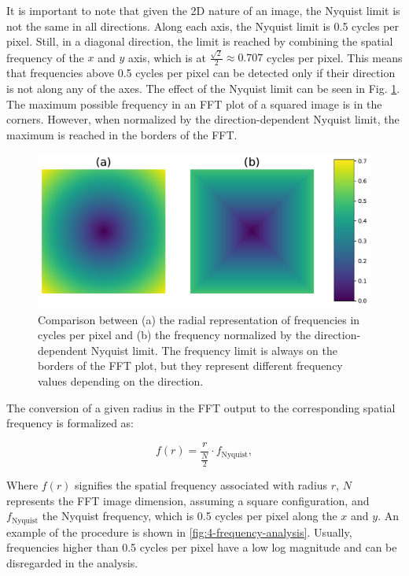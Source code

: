         It is important to note that given the 2D nature of an image, the Nyquist limit is not the same in all directions. 
        Along each axis, the Nyquist limit is 0.5 cycles per pixel. Still, in a diagonal direction, the limit is reached by combining the spatial frequency of the $x$ and $y$ axis, which is at $\frac{\sqrt{2}}{2} \approx 0.707$ cycles per pixel. 
        This means that frequencies above 0.5 cycles per pixel can be detected only if their direction is not along any of the axes.
        The effect of the Nyquist limit can be seen in Fig. \ref{fig:5-square_vs_radial}. The maximum possible frequency in an FFT plot of a squared image is in the corners. However, when normalized by the direction-dependent Nyquist limit, the maximum is reached in the borders of the FFT.

        \begin{figure}[H]
            \centering
            \includegraphics[width=\linewidth]{Includes/5-square_vs_radial.pdf}
            \caption{Comparison between (a) the radial representation of frequencies in cycles per pixel and (b) the frequency normalized by the direction-dependent Nyquist limit. The frequency limit is always on the borders of the FFT plot, but they represent different frequency values depending on the direction.
            }
            \label{fig:5-square_vs_radial}
        \end{figure}
        
        
        The conversion of a given radius in the FFT output to the corresponding spatial frequency is formalized as:

        \begin{equation}
            f(r) = \frac{r}{\frac{N}{2}} \cdot f_{\text{Nyquist}},
        \end{equation}

        Where \( f(r) \) signifies the spatial frequency associated with radius \( r \), \( N \) represents the FFT image dimension, assuming a square configuration, and \( f_{\text{Nyquist}} \) the Nyquist frequency, which is 0.5 cycles per pixel along the $x$ and $y$. An example of the procedure is shown in \ref{fig:4-frequency-analysis}. Usually, frequencies higher than 0.5 cycles per pixel have a low log magnitude and can be disregarded in the analysis.

